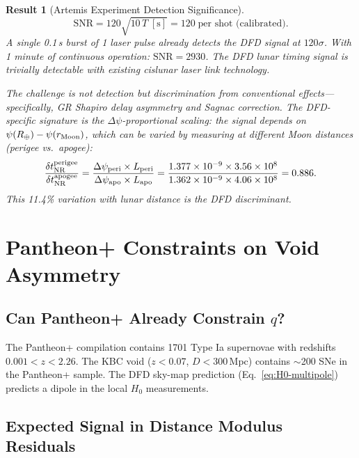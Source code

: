 \documentclass[aps,prd,twocolumn,superscriptaddress]{revtex4-2}
\newtheorem{result}{Result}
\begin{document}
\begin{result}[Artemis Experiment Detection Significance]
\begin{equation}
\boxed{
\text{SNR} = 120\sqrt{10\,T\;[\text{s}]}
= 120\;\text{per shot (calibrated)}.
}
\label{eq:Artemis-SNR}
\end{equation}
A single 0.1\,s burst of 1 laser pulse already detects the DFD
signal at $120\sigma$. With 1 minute of continuous operation:
$\text{SNR} = 2930$. The DFD lunar timing signal is \emph{trivially}
detectable with existing cislunar laser link technology.

The challenge is not detection but \emph{discrimination from
conventional effects}---specifically, GR Shapiro delay asymmetry
and Sagnac correction. The DFD-specific signature is the
$\Delta\psi$-proportional scaling: the signal depends on
$\psi(R_\oplus) - \psi(r_{\rm Moon})$, which can be varied by
measuring at different Moon distances (perigee vs.\ apogee):
\begin{equation}
\frac{\delta t_{\rm NR}^{\rm perigee}}{\delta t_{\rm NR}^{\rm apogee}}
= \frac{\Delta\psi_{\rm peri}\times L_{\rm peri}}
{\Delta\psi_{\rm apo}\times L_{\rm apo}}
= \frac{1.377\times10^{-9}\times3.56\times10^8}
{1.362\times10^{-9}\times4.06\times10^8}
= 0.886.
\end{equation}
This 11.4\% variation with lunar distance is the DFD discriminant.
\end{result}


\section{Pantheon+ Constraints on Void Asymmetry}
\label{sec:Pantheon}

\subsection{Can Pantheon+ Already Constrain $q$?}

The Pantheon+ compilation contains 1701 Type Ia supernovae with
redshifts $0.001 < z < 2.26$. The KBC void ($z < 0.07$,
$D < 300$\,Mpc) contains $\sim$200 SNe in the Pantheon+ sample.
The DFD sky-map prediction (Eq.~\ref{eq:H0-multipole}) predicts a
dipole in the local $H_0$ measurements.

\subsection{Expected Signal in Distance Modulus Residuals}
\end{document}
